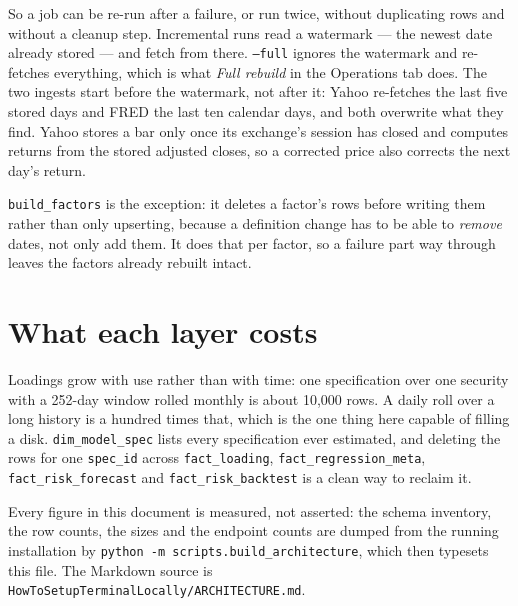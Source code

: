 \documentclass[11pt,a4paper]{article}
\newcommand{\code}[1]{\texttt{\small #1}}
\begin{document}
So a job can be re-run after a failure, or run twice, without duplicating rows and
without a cleanup step. Incremental runs read a watermark --- the newest date
already stored --- and fetch from there. \code{--full} ignores the
watermark and re-fetches everything, which is what \emph{Full rebuild} in the
Operations tab does. The two ingests start before the watermark, not after it:
Yahoo re-fetches the last five stored days and FRED the last ten calendar days,
and both overwrite what they find. Yahoo stores a bar only once its exchange's
session has closed and computes returns from the stored adjusted closes, so a
corrected price also corrects the next day's return.

\code{build\_factors} is the exception: it deletes a factor's rows before writing
them rather than only upserting, because a definition change has to be able to
\emph{remove} dates, not only add them. It does that per factor, so a failure part
way through leaves the factors already rebuilt intact.

\section{What each layer costs}

\schemaLayers{}

Loadings grow with use rather than with time: one specification over one security
with a 252-day window rolled monthly is about 10{,}000 rows. A daily roll over a
long history is a hundred times that, which is the one thing here capable of
filling a disk. \code{dim\_model\_spec} lists every specification ever estimated,
and deleting the rows for one \code{spec\_id} across \code{fact\_loading},
\code{fact\_regression\_meta}, \code{fact\_risk\_forecast} and
\code{fact\_risk\_backtest} is a clean way to reclaim it.

\vspace{1.4ex}
{\footnotesize\color{ink}
Every figure in this document is measured, not asserted: the schema inventory, the
row counts, the sizes and the endpoint counts are dumped from the running
installation by \code{python -m scripts.build\_architecture}, which then typesets
this file. The Markdown source is
\code{HowToSetupTerminalLocally/ARCHITECTURE.md}.\par}
\end{document}
